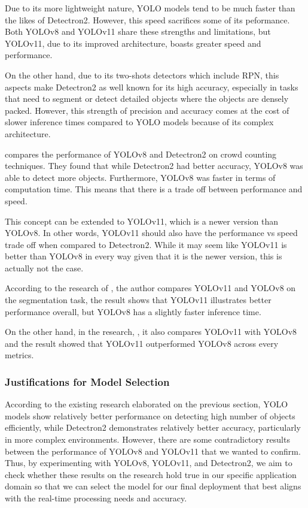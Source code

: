 \documentclass[stu,12pt,floatsintext]{apa7}
\begin{document}
Due to its more lightweight nature, YOLO models tend to be much faster than the likes of Detectron2. However, this speed sacrifices some of its peformance. Both YOLOv8 and YOLOv11 share these strengths and limitations, but YOLOv11, due to its improved architecture, boasts greater speed and performance.

On the other hand, due to its two-shots detectors which include RPN, this aspects make Detectron2 as well known for its high accuracy, especially in tasks that need to segment or detect detailed objects where the objects are densely packed. However, this strength of precision and accuracy comes at the cost of slower inference times compared to YOLO models because of its complex architecture.

\textcite{wadhwa_comparison_2023} compares the performance of YOLOv8 and Detectron2 on crowd counting techniques. They found that while Detectron2 had better accuracy, YOLOv8 was able to detect more objects. Furthermore, YOLOv8 was faster in terms of computation time. This means that there is a trade off between performance and speed.

This concept can be extended to YOLOv11, which is a newer version than YOLOv8. In other words, YOLOv11 should also have the performance vs speed trade off when compared to Detectron2. While it may seem like YOLOv11 is better than YOLOv8 in every way given that it is the newer version, this is actually not the case.

According to the research of \textcite{sapkota_comparing_2024}, the author compares YOLOv11 and YOLOv8 on the segmentation task, the result shows that YOLOv11 illustrates better performance overall, but YOLOv8 has a slightly faster inference time.

On the other hand, in the research, \textcite{alif_yolov11_2024}, it also compares YOLOv11 with YOLOv8 and the result showed that YOLOv11 outperformed YOLOv8 across every metrics.

\subsubsection{Justifications for Model Selection}

According to the existing research elaborated on the previous section, YOLO models show relatively better performance on detecting high number of objects efficiently, while Detectron2 demonstrates relatively better accuracy, particularly in more complex environments. However, there are some contradictory results between the performance of YOLOv8 and YOLOv11 that we wanted to confirm. Thus, by experimenting with YOLOv8, YOLOv11, and Detectron2, we aim to check whether these results on the research hold true in our specific application domain so that we can select the model for our final deployment that best aligns with the real-time processing needs and accuracy.
\end{document}
